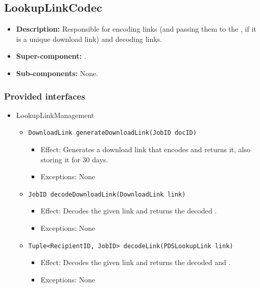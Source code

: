 \subsection{LookupLinkCodec}
\begin{itemize}
    \item \textbf{Description:} Responsible for encoding links (and passing them to the , if it is a unique download link) and decoding links.
    \item \textbf{Super-component:} .
    \item \textbf{Sub-components:} None.
\end{itemize}

\subsubsection*{Provided interfaces}
\begin{itemize}
    \item LookupLinkManagement
    \begin{itemize}
        \item \texttt{DownloadLink generateDownloadLink(JobID docID)}
        \begin{itemize}
            \item Effect: Generates a download link that encodes  and returns it, also storing it for 30 days.
            \item Exceptions: None
        \end{itemize}

        \item \texttt{JobID decodeDownloadLink(DownloadLink link)}
		    \begin{itemize}
                \item Effect: Decodes the given link and returns the decoded .
                \item Exceptions: None
            \end{itemize}

		\item \texttt{Tuple<RecipientID, JobID> decodeLink(PDSLookupLink link)}
		    \begin{itemize}
                \item Effect: Decodes the given link and returns the decoded  and .
                \item Exceptions: None
            \end{itemize}
    \end{itemize}
\end{itemize}

